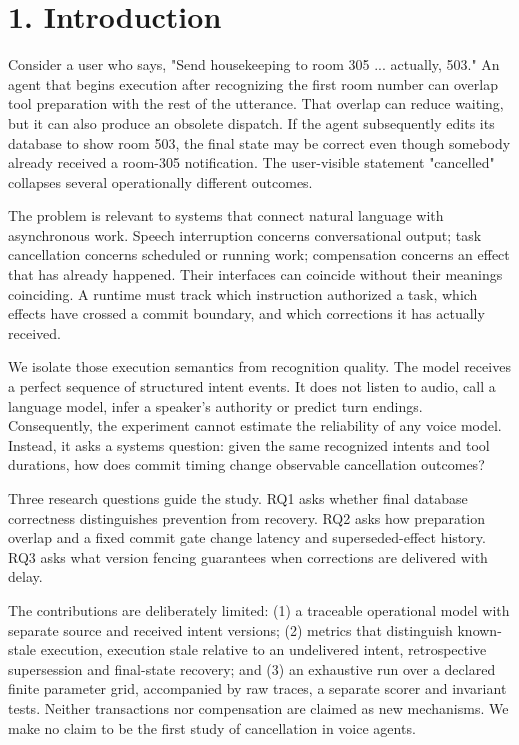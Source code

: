 \documentclass[10pt]{article}
\begin{document}
\section*{1. Introduction}

Consider a user who says, "Send housekeeping to room 305 ... actually, 503." An agent that begins execution after recognizing the first room number can overlap tool preparation with the rest of the utterance. That overlap can reduce waiting, but it can also produce an obsolete dispatch. If the agent subsequently edits its database to show room 503, the final state may be correct even though somebody already received a room-305 notification. The user-visible statement "cancelled" collapses several operationally different outcomes.


The problem is relevant to systems that connect natural language with asynchronous work. Speech interruption concerns conversational output; task cancellation concerns scheduled or running work; compensation concerns an effect that has already happened. Their interfaces can coincide without their meanings coinciding. A runtime must track which instruction authorized a task, which effects have crossed a commit boundary, and which corrections it has actually received.


We isolate those execution semantics from recognition quality. The model receives a perfect sequence of structured intent events. It does not listen to audio, call a language model, infer a speaker's authority or predict turn endings. Consequently, the experiment cannot estimate the reliability of any voice model. Instead, it asks a systems question: given the same recognized intents and tool durations, how does commit timing change observable cancellation outcomes?


Three research questions guide the study. RQ1 asks whether final database correctness distinguishes prevention from recovery. RQ2 asks how preparation overlap and a fixed commit gate change latency and superseded-effect history. RQ3 asks what version fencing guarantees when corrections are delivered with delay.


The contributions are deliberately limited: (1) a traceable operational model with separate source and received intent versions; (2) metrics that distinguish known-stale execution, execution stale relative to an undelivered intent, retrospective supersession and final-state recovery; and (3) an exhaustive run over a declared finite parameter grid, accompanied by raw traces, a separate scorer and invariant tests. Neither transactions nor compensation are claimed as new mechanisms. We make no claim to be the first study of cancellation in voice agents.
\end{document}
